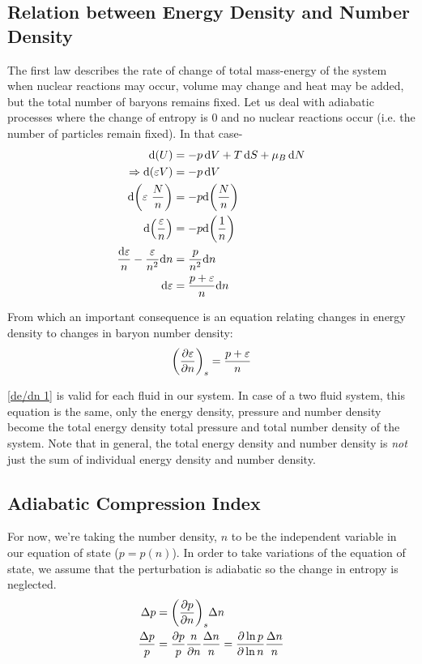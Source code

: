 \documentclass[12pt, letterpaper]{report}
\begin{document}
\subsection{Relation between Energy Density and Number Density}

The first law describes the rate of change of total mass-energy of the system when nuclear reactions may occur, volume may change and heat may be added, but the total number of baryons remains fixed. Let us deal with adiabatic processes where the change of entropy is $0$ and no nuclear reactions occur (i.e. the number of particles remain fixed). In that case-
\begin{align*}
    \dd\qty({U})&= -p\dd{V}+T\dd{S}+ \mu_B \dd{N}\\
    \Rightarrow\dd\qty(\varepsilon V)&= -p\dd{V}\\
    \dd\qty({\varepsilon\  \frac{N}{n}})&= -p\dd\qty(\frac{N}{n})\\
    \dd\qty({\frac{\varepsilon}{n}})&= -p\dd\qty(\frac{1}{n})\\
    \frac{\dd{\varepsilon}}{n}- \frac{\varepsilon}{n^2}\dd n&= \frac{p}{n^2}\dd n \\
    \dd{\varepsilon}&= \frac{p+\varepsilon}{n}\dd n
\end{align*}

From which an important consequence is an equation relating changes in energy density to changes in baryon number density: 
\begin{equation}
    \qty(\pdv{\varepsilon}{n})_{s}= \frac{p+\varepsilon}{n} \label{de/dn 1}
\end{equation}

\cref{de/dn 1} is valid for each fluid in our system. In case of a two fluid system, this equation is the same, only the energy density, pressure and number density become the total energy density total pressure and total number density of the system. Note that in general, the total energy density and number density is \emph{not} just the sum of individual energy density and number density. 

\subsection{Adiabatic Compression Index}

For now, we're taking the number density, $n$ to be the independent variable in our equation of state ($p=p(n)$). In order to take variations of the equation of state, we assume that the perturbation is adiabatic so the change in entropy is neglected.
\begin{align*}
    \Delta p&= \qty(\pdv{p}{n})_s\Delta n\\
    \frac{\Delta p}{p}&= \frac{\partial p}{p}\frac{n}{\partial n}\frac{\Delta n}{n}= \frac{\partial \ln p}{\partial \ln n}\frac{\Delta n}{n}
\end{align*}
\end{document}
